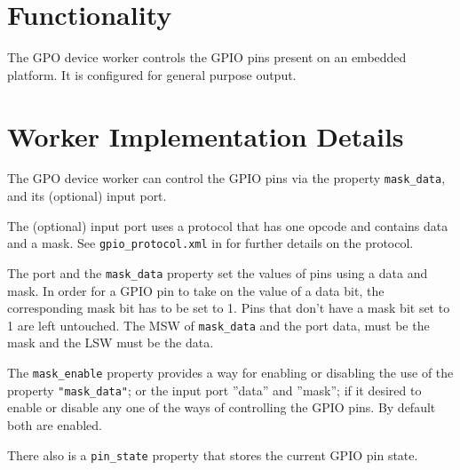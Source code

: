 \def\name{\comp}
\def\workertype{}
\def\version{\ocpiversion}
\def\releasedate{11/2019}
\def\componentlibrary{ocpi.assets.devices}
\def\workers{\comp{}.hdl}
\def\testedplatforms{matchstiq\_{}z1, xsim}


\section*{Functionality}
\begin{flushleft}
The GPO device worker controls the GPIO pins present on an embedded platform. It is configured for general purpose output.

\end{flushleft}

\section*{Worker Implementation Details}
\begin{flushleft}

The GPO device worker can control the GPIO pins via the property \texttt{mask\_data}, and its (optional) input port. \newline

The (optional) input port uses a protocol that has one opcode and contains data and a mask. See \texttt{gpio\_protocol.xml} in   for further details on the protocol. \newline

The port and the \texttt{mask\_data} property set the values of pins using a
data and mask. In order for a GPIO pin to take on the value of a data bit,
the corresponding mask bit has to be set to 1. Pins that don't have a mask bit set to 1 are left untouched. The MSW of \texttt{mask\_data} and the port data, must be the mask and the LSW must be the data. \newline

The \texttt{mask\_enable} property provides a way for enabling or disabling the use of the property \texttt{"mask\_data"}; or the input port ”data” and ”mask”; if it desired to enable or disable any one of the ways of controlling the GPIO pins.
By default both are enabled. \newline

There also is a \texttt{pin\_state} property that stores the current GPIO pin state.

\end{flushleft}


